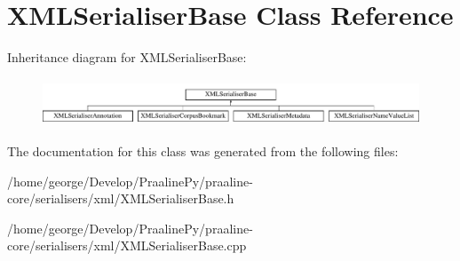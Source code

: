 \hypertarget{class_x_m_l_serialiser_base}{}\section{X\+M\+L\+Serialiser\+Base Class Reference}
\label{class_x_m_l_serialiser_base}
Inheritance diagram for X\+M\+L\+Serialiser\+Base\+:\begin{figure}[H]
\begin{center}
\leavevmode
\includegraphics[height=1.421320cm]{class_x_m_l_serialiser_base}
\end{center}
\end{figure}


The documentation for this class was generated from the following files\+:\begin{DoxyCompactItemize}
\item 
/home/george/\+Develop/\+Praaline\+Py/praaline-\/core/serialisers/xml/X\+M\+L\+Serialiser\+Base.\+h\item 
/home/george/\+Develop/\+Praaline\+Py/praaline-\/core/serialisers/xml/X\+M\+L\+Serialiser\+Base.\+cpp\end{DoxyCompactItemize}
